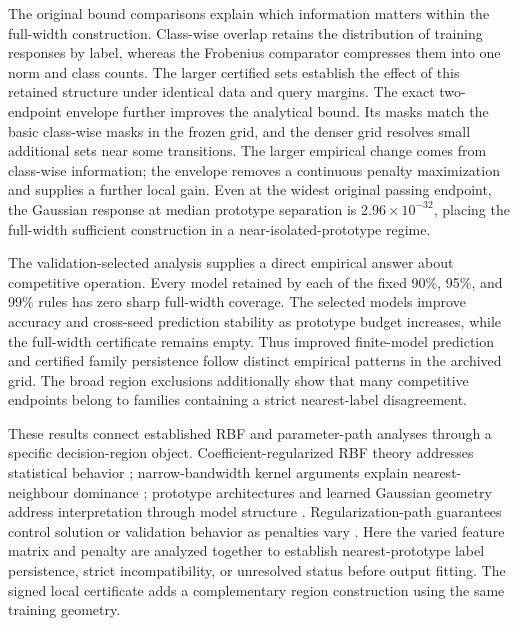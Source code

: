 \documentclass[preprint,12pt,authoryear]{elsarticle}
\begin{document}
The original bound comparisons explain which information matters within the full-width construction. Class-wise overlap retains the distribution of training responses by label, whereas the Frobenius comparator compresses them into one norm and class counts. The larger certified sets establish the effect of this retained structure under identical data and query margins. The exact two-endpoint envelope further improves the analytical bound. Its masks match the basic class-wise masks in the frozen grid, and the denser grid resolves small additional sets near some transitions. The larger empirical change comes from class-wise information; the envelope removes a continuous penalty maximization and supplies a further local gain. Even at the widest original passing endpoint, the Gaussian response at median prototype separation is $2.96\times10^{-32}$, placing the full-width sufficient construction in a near-isolated-prototype regime.

The validation-selected analysis supplies a direct empirical answer about competitive operation. Every model retained by each of the fixed 90\%, 95\%, and 99\% rules has zero sharp full-width coverage. The selected models improve accuracy and cross-seed prediction stability as prototype budget increases, while the full-width certificate remains empty. Thus improved finite-model prediction and certified family persistence follow distinct empirical patterns in the archived grid. The broad region exclusions additionally show that many competitive endpoints belong to families containing a strict nearest-label disagreement.

These results connect established RBF and parameter-path analyses through a specific decision-region object. Coefficient-regularized RBF theory addresses statistical behavior \citep{que2016}; narrow-bandwidth kernel arguments explain nearest-neighbour dominance \citep{radhakrishnan2023}; prototype architectures and learned Gaussian geometry address interpretation through model structure \citep{saralajew2025,dagostino2024}. Regularization-path guarantees control solution or validation behavior as penalties vary \citep{shibagaki2015,ndiaye2019}. Here the varied feature matrix and penalty are analyzed together to establish nearest-prototype label persistence, strict incompatibility, or unresolved status before output fitting. The signed local certificate adds a complementary region construction using the same training geometry.
\end{document}
